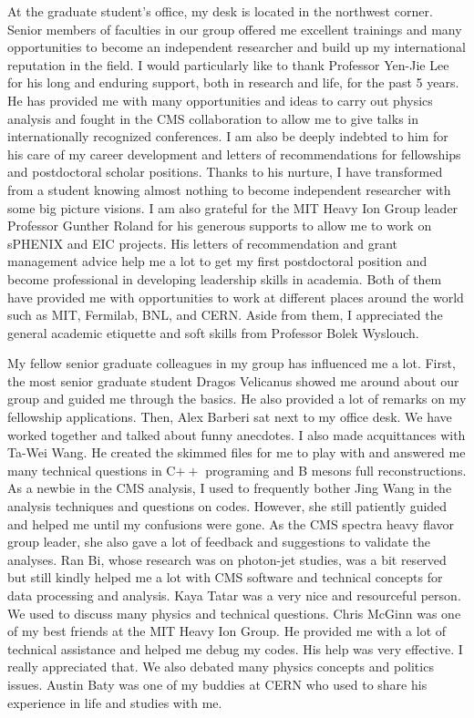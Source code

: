 At the graduate student's office, my desk is located in the northwest corner. Senior members of faculties in our group offered me excellent trainings and many opportunities to become an independent researcher and build up my international reputation in the field. I would particularly like to thank Professor Yen-Jie Lee for his long and enduring support, both in research and life, for the past 5 years. He has provided me with many opportunities and ideas to carry out physics analysis and fought in the CMS collaboration to allow me to give talks in internationally recognized conferences. I am also be deeply indebted to him for his care of my career development and letters of recommendations for fellowships and postdoctoral scholar positions. Thanks to his nurture, I have transformed from a student knowing almost nothing to become independent researcher with some big picture visions. I am also grateful for the MIT Heavy Ion Group leader Professor Gunther Roland for his generous supports to allow me to work on sPHENIX and EIC projects. His letters of recommendation and grant management advice help me a lot to get my first postdoctoral position and become professional in developing leadership skills in academia. Both of them have provided me with opportunities to work at different places around the world such as MIT, Fermilab, BNL, and CERN. Aside from them, I appreciated the general academic etiquette and soft skills from Professor Bolek Wyslouch.


My fellow senior graduate colleagues in my group has influenced me a lot. First, the most senior graduate student Dragos Velicanus showed me around about our group and guided me through the basics. He also provided a lot of remarks on my fellowship applications. Then, Alex Barberi sat next to my office desk. We have worked together and talked about funny anecdotes. I also made acquittances with Ta-Wei Wang. He created the skimmed files for me to play with and answered me many technical questions in C$++$ programing and B mesons full reconstructions. As a newbie in the CMS analysis, I used to frequently bother Jing Wang in the analysis techniques and questions on codes. However, she still patiently guided and helped me until my confusions were gone. As the CMS spectra heavy flavor group leader, she also gave a lot of feedback and suggestions to validate the analyses. Ran Bi, whose research was on photon-jet studies, was a bit reserved but still kindly helped me a lot with CMS software and technical concepts for data processing and analysis. Kaya Tatar was a very nice and resourceful person. We used to discuss many physics and technical questions. Chris McGinn was one of my best friends at the MIT Heavy Ion Group. He provided me with a lot of technical assistance and helped me debug my codes. His help was very effective. I really appreciated that. We also debated many physics concepts and politics issues. Austin Baty was one of my buddies at CERN who used to share his experience in life and studies with me.  

